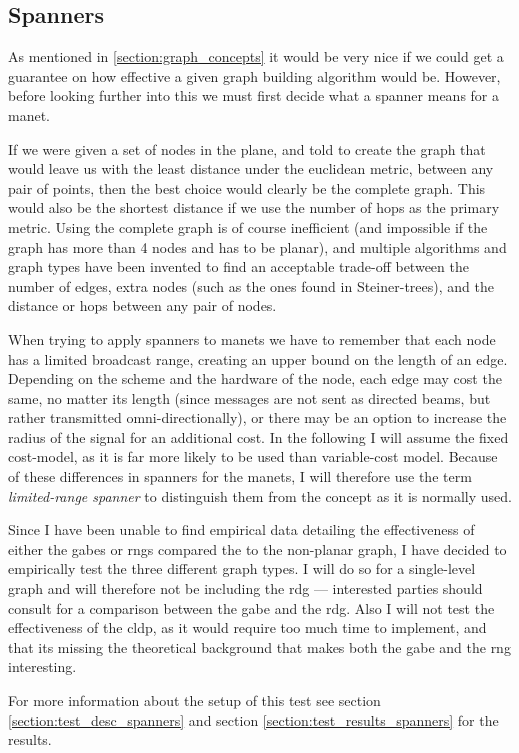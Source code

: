 
\subsection{Spanners}
\label{section:spanners}
As mentioned in \ref{section:graph_concepts} it would be very nice if we could get a guarantee on how effective a given graph building algorithm would be. However, before looking further into this we must first decide what a spanner means for a \ac{manet}.

If we were given a set of nodes in the plane, and told to create the graph that would leave us with the least distance under the euclidean metric, between any pair of points, then the best choice would clearly be the complete graph. This would also be the shortest distance if we use the number of hops as the primary metric. Using the complete graph is of course inefficient (and impossible if the graph has more than 4 nodes and has to be planar), and multiple algorithms and graph types have been invented to find an acceptable trade-off between the number of edges, extra nodes (such as the ones found in Steiner-trees), and the distance or hops between any pair of nodes.

When trying to apply spanners to \acp{manet} we have to remember that each node has a limited broadcast range, creating an upper bound on the length of an edge. Depending on the scheme and the hardware of the node, each edge may cost the same, no matter its length (since messages are not sent as directed beams, but rather transmitted omni-directionally), or there may be an option to increase the radius of the signal for an additional cost. In the following I will assume the fixed cost-model, as it is far more likely to be used than variable-cost model. Because of these differences in spanners for the \acp{manet}, I will therefore use the term \emph{limited-range spanner} to distinguish them from the concept as it is normally used. 

Since I have been unable to find empirical data detailing the effectiveness of either the \acp{gabe} or \acp{rng} compared the to the non-planar graph, I have decided to empirically test the three different graph types. I will do so for a single-level graph and will therefore not be including the \ac{rdg} --- interested parties should consult \cite{GeoSpanners} for a comparison between the \ac{gabe} and the \ac{rdg}. Also I will not test the effectiveness of the \ac{cldp}, as it would require too much time to implement, and that its missing the theoretical background that makes both the \ac{gabe} and the \ac{rng} interesting.

For more information about the setup of this test see section \ref{section:test_desc_spanners} and section \ref{section:test_results_spanners} for the results.
